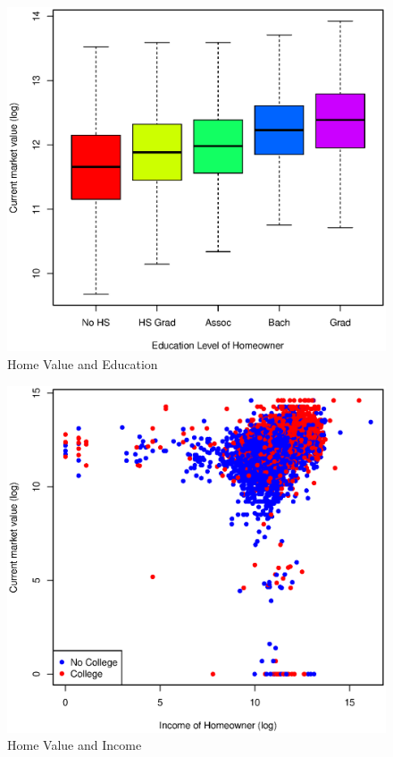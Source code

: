 \documentclass[11pt, fleqn]{article}
\begin{document}
\begin{figure}[!htb]
  \centering
  \includegraphics[scale=.5]{hhgrad.eps}
  \caption{Home Value and Education}
  \label{fig:hhgrad}
\end{figure}

\begin{figure}[!htb]
  \centering
  \includegraphics[scale=.5]{income.eps}
  \caption{Home Value and Income}
  \label{fig:income}
\end{figure}
\end{document}
